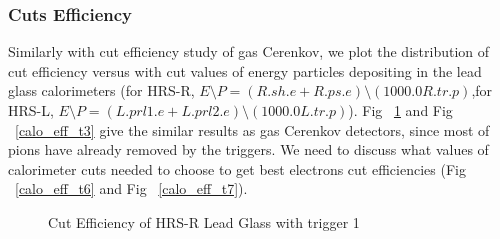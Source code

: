 % 
% 
% 


\subsubsection{Cuts Efficiency}

Similarly with cut efficiency study of gas Cerenkov, we plot the distribution of cut efficiency versus with cut values of energy particles depositing in the lead glass calorimeters (for HRS-R, $E\setminus P =(R.sh.e+R.ps.e)\setminus (1000.0 R.tr.p)$,for HRS-L, $E\setminus P = (L.prl1.e+L.prl2.e)\setminus(1000.0 L.tr.p)$). Fig ~\ref{calo_eff_t1} and Fig ~\ref{calo_eff_t3} give the similar results as gas Cerenkov detectors, since most of pions have already removed by the triggers. We need to discuss what values of calorimeter cuts needed to choose to get best electrons cut efficiencies (Fig ~\ref{calo_eff_t6} and Fig ~\ref{calo_eff_t7}).

 \begin{figure}[htb]
 \centerline{}
 \caption[Cut Efficiency of HRS-R Lead Glass with trigger 1 ]{\footnotesize{Cut Efficiency of HRS-R Lead Glass with trigger 1}
 \label{calo_eff_t1}}
 \end{figure}

